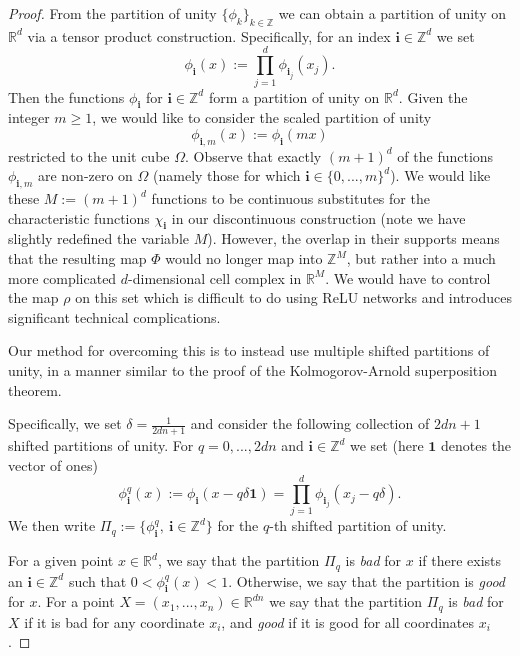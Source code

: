 \documentclass[twoside,11pt]{article}
\begin{document}
\begin{proof}
    From the partition of unity $\{\phi_k\}_{k\in\mathbb{Z}}$ we can obtain a partition of unity on $\mathbb{R}^d$ via a tensor product construction. Specifically, for an index $\textbf{i}\in \mathbb{Z}^d$ we set
    \begin{equation}
        \phi_{\textbf{i}}(x) := \prod_{j=1}^d\phi_{\textbf{i}_j}(x_j).
    \end{equation}
    Then the functions $\phi_{\textbf{i}}$ for $\textbf{i}\in \mathbb{Z}^d$ form a partition of unity on $\mathbb{R}^d$. Given the integer $m \geq 1$, we would like to consider the scaled partition of unity
    \begin{equation}
        \phi_{\textbf{i},m}(x) := \phi_{\textbf{i}}(mx)
    \end{equation}
    restricted to the unit cube $\Omega$. Observe that exactly $(m+1)^d$ of the functions $\phi_{\textbf{i},m}$ are non-zero on $\Omega$ (namely those for which $\textbf{i}\in \{0,...,m\}^d$). We would like these $M := (m+1)^d$ functions to be continuous substitutes for the characteristic functions $\chi_{\textbf{i}}$ in our discontinuous construction (note we have slightly redefined the variable $M$). However, the overlap in their supports means that the resulting map $\Phi$ would no longer map into $\mathbb{Z}^M$, but rather into a much more complicated $d$-dimensional cell complex in $\mathbb{R}^M$. We would have to control the map $\rho$ on this set which is difficult to do using ReLU networks and introduces significant technical complications.

    Our method for overcoming this is to instead use multiple shifted partitions of unity, in a manner similar to the proof of the Kolmogorov-Arnold superposition theorem. 
    
    Specifically, we set $\delta = \frac{1}{2dn+1}$ and consider the following collection of $2dn+1$ shifted partitions of unity. For $q=0,...,2dn$ and $\textbf{i}\in \mathbb{Z}^d$ we set (here $\textbf{1}$ denotes the vector of ones)
    \begin{equation}\label{shifted-partition-definition-equation}
        \phi^q_{\textbf{i}}(x) := \phi_{\textbf{i}}(x - q\delta \textbf{1}) = \prod_{j=1}^d\phi_{\textbf{i}_j}(x_j - q\delta).
    \end{equation}
    We then write $\Pi_q := \{\phi^q_{\textbf{i}},~\textbf{i}\in \mathbb{Z}^d\}$ for the $q$-th shifted partition of unity. 
    
    For a given point $x\in \mathbb{R}^d$, we say that the partition $\Pi_q$ is \textit{bad} for $x$ if there exists an $\textbf{i}\in \mathbb{Z}^d$ such that $0 < \phi^q_{\textbf{i}}(x) < 1$. Otherwise, we say that the partition is \textit{good} for $x$. For a point $X = (x_1,...,x_n)\in \mathbb{R}^{dn}$ we say that the partition $\Pi_q$ is \textit{bad} for $X$ if it is bad for any coordinate $x_i$, and \textit{good} if it is good for all coordinates $x_i$.
    

\end{proof}
\end{document}
